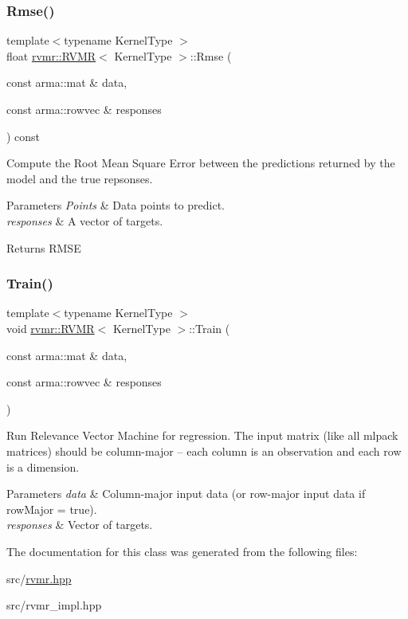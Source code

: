 \subsubsection{\texorpdfstring{Rmse()}{Rmse()}}
{\footnotesize\ttfamily template$<$typename Kernel\+Type $>$ \\
float \hyperlink{classrvmr_1_1RVMR}{rvmr\+::\+R\+V\+MR}$<$ Kernel\+Type $>$\+::Rmse (\begin{DoxyParamCaption}\item[{const arma\+::mat \&}]{data,  }\item[{const arma\+::rowvec \&}]{responses }\end{DoxyParamCaption}) const}

Compute the Root Mean Square Error between the predictions returned by the model and the true repsonses. 
\begin{DoxyParams}{Parameters}
{\em Points} & Data points to predict. \\
\hline
{\em responses} & A vector of targets. \\
\hline
\end{DoxyParams}
\begin{DoxyReturn}{Returns}
R\+M\+SE 
\end{DoxyReturn}
\mbox{\label{classrvmr_1_1RVMR_a7393bb3c699351170d0fed02f8450fff}} 
\subsubsection{\texorpdfstring{Train()}{Train()}}
{\footnotesize\ttfamily template$<$typename Kernel\+Type $>$ \\
void \hyperlink{classrvmr_1_1RVMR}{rvmr\+::\+R\+V\+MR}$<$ Kernel\+Type $>$\+::Train (\begin{DoxyParamCaption}\item[{const arma\+::mat \&}]{data,  }\item[{const arma\+::rowvec \&}]{responses }\end{DoxyParamCaption})}

Run Relevance Vector Machine for regression. The input matrix (like all mlpack matrices) should be column-\/major -- each column is an observation and each row is a dimension.


\begin{DoxyParams}{Parameters}
{\em data} & Column-\/major input data (or row-\/major input data if row\+Major = true). \\
\hline
{\em responses} & Vector of targets. \\
\hline
\end{DoxyParams}


The documentation for this class was generated from the following files\+:\begin{DoxyCompactItemize}
\item 
src/\hyperlink{rvmr_8hpp}{rvmr.\+hpp}\item 
src/rvmr\+\_\+impl.\+hpp\end{DoxyCompactItemize}
